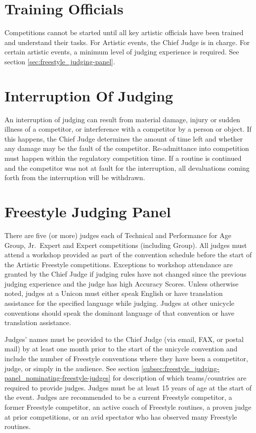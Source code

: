 \section{Training Officials}
Competitions cannot be started until all key artistic officials have been trained and understand their tasks.
For Artistic events, the Chief Judge is in charge.
For certain artistic events, a minimum level of judging experience is required.
See section \ref{sec:freestyle_judging-panel}.

\section{Interruption Of Judging}
An interruption of judging can result from material damage, injury or sudden illness of a competitor, or interference with a competitor by a person or object.
If this happens, the Chief Judge determines the amount of time left and whether any damage may be the fault of the competitor.
Re-admittance into competition must happen within the regulatory competition time.
If a routine is continued and the competitor was not at fault for the interruption, all devaluations coming forth from the interruption will be withdrawn.

\section{Freestyle Judging Panel \label{sec:freestyle_judging-panel}}
There are five (or more) judges each of Technical and Performance for Age Group, Jr.~Expert and Expert competitions (including Group).
All judges must attend a workshop provided as part of the convention schedule before the start of the Artistic Freestyle competitions.
Exceptions to workshop attendance are granted by the Chief Judge if judging rules have not changed since the previous judging experience and the judge has high Accuracy Scores.%
Unless otherwise noted, judges at a Unicon must either speak English or have translation assistance for the specified language while judging.
Judges at other unicycle conventions should speak the dominant language of that convention or have translation assistance.

Judges' names must be provided to the Chief Judge (via email, FAX, or postal mail) by at least one month prior to the start of the unicycle convention and include the number of Freestyle conventions where they have been a competitor, judge, or simply in the audience.%
See section \ref{subsec:freestyle_judging-panel_nominating-freestyle-judges} for description of which teams/countries are required to provide judges.
Judges must be at least 15 years of age at the start of the event.%
Judges are recommended to be a current Freestyle competitor, a former Freestyle competitor, an active coach of Freestyle routines, a proven judge at prior competitions, or an avid spectator who has observed many Freestyle routines.

